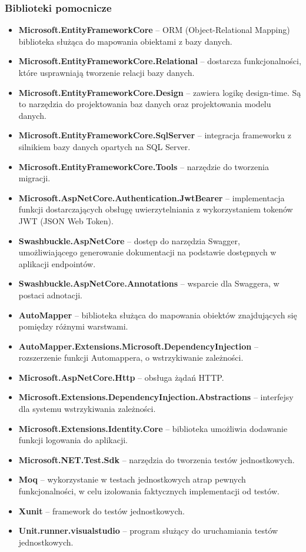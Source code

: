 \documentclass[a4paper,twoside,12pt]{book}
\begin{document}
\subsubsection{Biblioteki pomocnicze}
    \begin{itemize}
        \item \textbf{Microsoft.EntityFrameworkCore} -- ORM (Object-Relational Mapping) biblioteka służąca do mapowania obiektami z bazy danych.
        \item \textbf{Microsoft.EntityFrameworkCore.Relational} -- dostarcza funkcjonalności, które usprawniają tworzenie relacji bazy danych.
        \item \textbf{Microsoft.EntityFrameworkCore.Design} -- zawiera logikę design-time. Są to narzędzia do projektowania baz danych oraz projektowania modelu danych.
        \item \textbf{Microsoft.EntityFrameworkCore.SqlServer} -- integracja frameworku z silnikiem bazy danych opartych na SQL Server.
        \item \textbf{Microsoft.EntityFrameworkCore.Tools} -- narzędzie do tworzenia migracji.
        \item \textbf{Microsoft.AspNetCore.Authentication.JwtBearer} -- implementacja funkcji dostarczających obsługę uwierzytelniania z wykorzystaniem tokenów JWT (JSON Web Token).
        \item \textbf{Swashbuckle.AspNetCore} -- dostęp do narzędzia Swagger, umożliwiającego generowanie dokumentacji na podstawie dostępnych w aplikacji endpointów.
        \item \textbf{Swashbuckle.AspNetCore.Annotations} -- wsparcie dla Swaggera, w postaci adnotacji.
        \item \textbf{AutoMapper} -- biblioteka służąca do mapowania obiektów znajdujących się pomiędzy różnymi warstwami.
        \item \textbf{AutoMapper.Extensions.Microsoft.DependencyInjection} -- rozszerzenie funkcji Automappera, o wstrzykiwanie zależności.
        \item \textbf{Microsoft.AspNetCore.Http} -- obsługa żądań HTTP.
        \item \textbf{Microsoft.Extensions.DependencyInjection.Abstractions} -- interfejsy dla systemu wstrzykiwania zależności.
        \item \textbf{Microsoft.Extensions.Identity.Core} -- biblioteka umożliwia dodawanie funkcji logowania do aplikacji.
        \item \textbf{Microsoft.NET.Test.Sdk}  -- narzędzia do tworzenia testów jednostkowych.
        \item \textbf{Moq} -- wykorzystanie w testach jednostkowych atrap pewnych funkcjonalności, w celu izolowania faktycznych implementacji od testów.
        \item \textbf{Xunit} -- framework do testów jednostkowych.
        \item \textbf{Unit.runner.visualstudio} -- program służący do uruchamiania testów jednostkowych.
    \end{itemize}
\end{document}
